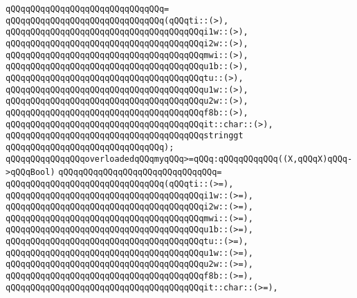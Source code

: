 \verb|qQQqqQQqqQQqqQQqqQQqqQQqqQQqqQQq=|\newline
\verb|qQQqqQQqqQQqqQQqqQQqqQQqqQQqqQQq(qQQqti::(>),|\newline
\verb|qQQqqQQqqQQqqQQqqQQqqQQqqQQqqQQqqQQqqQQqi1w::(>),|\newline
\verb|qQQqqQQqqQQqqQQqqQQqqQQqqQQqqQQqqQQqqQQqi2w::(>),|\newline
\verb|qQQqqQQqqQQqqQQqqQQqqQQqqQQqqQQqqQQqqQQqmwi::(>),|\newline
\verb|qQQqqQQqqQQqqQQqqQQqqQQqqQQqqQQqqQQqqQQqu1b::(>),|\newline
\verb|qQQqqQQqqQQqqQQqqQQqqQQqqQQqqQQqqQQqqQQqtu::(>),|\newline
\verb|qQQqqQQqqQQqqQQqqQQqqQQqqQQqqQQqqQQqqQQqu1w::(>),|\newline
\verb|qQQqqQQqqQQqqQQqqQQqqQQqqQQqqQQqqQQqqQQqu2w::(>),|\newline
\verb|qQQqqQQqqQQqqQQqqQQqqQQqqQQqqQQqqQQqqQQqf8b::(>),|\newline
\verb|qQQqqQQqqQQqqQQqqQQqqQQqqQQqqQQqqQQqqQQqit::char::(>),|\newline
\verb|qQQqqQQqqQQqqQQqqQQqqQQqqQQqqQQqqQQqqQQqstringgt|\newline
\verb|qQQqqQQqqQQqqQQqqQQqqQQqqQQqqQQq);|\newline
\newline
\verb|qQQqqQQqqQQqqQQqoverloadedqQQqmyqQQq>=qQQq:qQQqqQQqqQQq((X,qQQqX)qQQq->qQQqBool)|\newline
\verb|qQQqqQQqqQQqqQQqqQQqqQQqqQQqqQQq=|\newline
\verb|qQQqqQQqqQQqqQQqqQQqqQQqqQQqqQQq(qQQqti::(>=),|\newline
\verb|qQQqqQQqqQQqqQQqqQQqqQQqqQQqqQQqqQQqqQQqi1w::(>=),|\newline
\verb|qQQqqQQqqQQqqQQqqQQqqQQqqQQqqQQqqQQqqQQqi2w::(>=),|\newline
\verb|qQQqqQQqqQQqqQQqqQQqqQQqqQQqqQQqqQQqqQQqmwi::(>=),|\newline
\verb|qQQqqQQqqQQqqQQqqQQqqQQqqQQqqQQqqQQqqQQqu1b::(>=),|\newline
\verb|qQQqqQQqqQQqqQQqqQQqqQQqqQQqqQQqqQQqqQQqtu::(>=),|\newline
\verb|qQQqqQQqqQQqqQQqqQQqqQQqqQQqqQQqqQQqqQQqu1w::(>=),|\newline
\verb|qQQqqQQqqQQqqQQqqQQqqQQqqQQqqQQqqQQqqQQqu2w::(>=),|\newline
\verb|qQQqqQQqqQQqqQQqqQQqqQQqqQQqqQQqqQQqqQQqf8b::(>=),|\newline
\verb|qQQqqQQqqQQqqQQqqQQqqQQqqQQqqQQqqQQqqQQqit::char::(>=),|\newline
